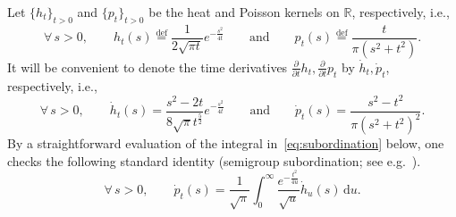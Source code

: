 \documentclass[11pt,reqno]{amsart}
\newcommand{\R}{\mathbb{R}}
\newcommand{\ud}[0]{\,\mathrm{d}}
\newcommand{\0}{\mathbf{0}}
\renewcommand{\1}{\mathbf 1}
\newcommand{\eqdef}{\stackrel{\mathrm{def}}{=}}
\theoremstyle{remark}
\begin{document}
Let $\{h_t\}_{t>0}$ and $\{p_t\}_{t>0}$ be the heat and Poisson kernels on $\R$, respectively, i.e.,
$$
\forall\, s>0,\qquad h_t(s)\eqdef \frac{1}{2\sqrt{\pi t}} e^{-\frac{s^2}{4t}}\qquad\mathrm{and}\qquad p_t(s)\eqdef \frac{t}{\pi(s^2+t^2)}.
$$
It will be convenient to denote the time derivatives $\frac{\partial}{\partial t} h_t, \frac{\partial}{\partial t} p_t$ by $\dot{h}_t,\dot{p}_t$, respectively, i.e.,
$$
\forall\, s>0,\qquad \dot{h}_t(s)=\frac{s^2-2t}{8\sqrt{\pi}t^{\frac52}}e^{-\frac{s^2}{4t}}\qquad\mathrm{and}\qquad \dot{p}_t(s)=\frac{s^2-t^2}{\pi(s^2+t^2)^2}.
$$
By a straightforward evaluation of the integral in~\eqref{eq:subordination} below, one checks the following standard identity  (semigroup subordination; see e.g.~\cite[Section~4.4]{Boc55}).
\begin{equation}\label{eq:subordination}
\forall\, s>0,\qquad \dot{p}_t(s)=\frac{1}{\sqrt{\pi}}\int_0^\infty \frac{e^{-\frac{t^2}{4u}}}{\sqrt{u}}\dot{h}_u(s)\ud u.
\end{equation}
\end{document}
